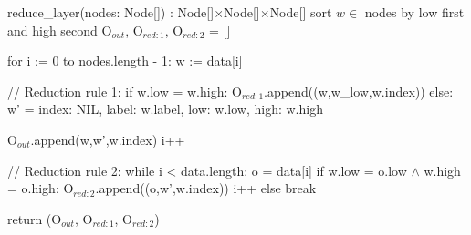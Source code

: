 \begin{blstlisting}
  reduce_layer(nodes: Node[]) : Node[]$\times$Node[]$\times$Node[]
    sort $w \in $ nodes by low first and high second
    O$_{\mathit{out}}$, O$_{\mathit{red:}1}$, O$_{\mathit{red:}2}$ = []

    for i := 0 to nodes.length - 1:
      w := data[i]

      // Reduction rule 1:
      if w.low = w.high:
        O$_{\mathit{red:}1}$.append((w,w_low,w.index))
      else:
        w' = {
          index: NIL,
          label: w.label,
          low: w.low,
          high: w.high
        }

        O$_{\mathit{out}}$.append(w,w',w.index)
        i++

        // Reduction rule 2:
        while i < data.length:
          o = data[i]
          if w.low = o.low $\land$ w.high = o.high:
            O$_{\mathit{red:}2}$.append((o,w',w.index))
            i++
          else break

    return (O$_{\mathit{out}}$, O$_{\mathit{red:}1}$, O$_{\mathit{red:}2}$)
\end{blstlisting}

